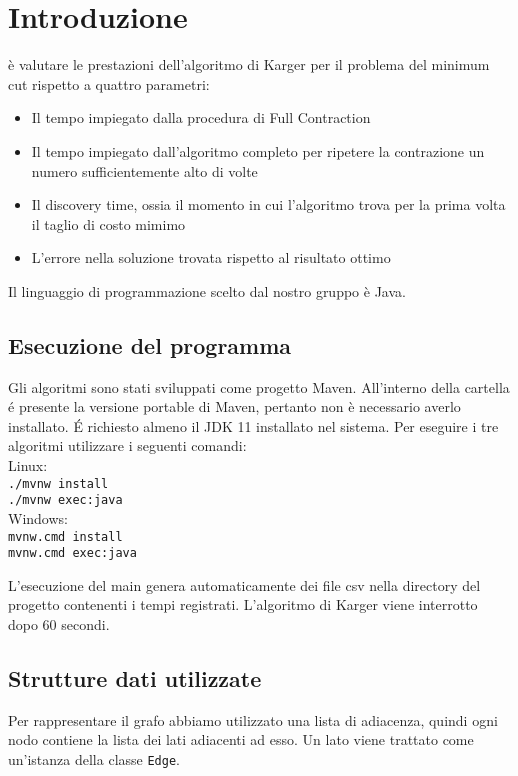 \section{Introduzione}

è valutare le prestazioni dell'algoritmo di Karger per il problema del minimum cut rispetto a quattro parametri:
\begin{itemize}
\item Il tempo impiegato dalla procedura di Full Contraction
\item Il tempo impiegato dall'algoritmo completo per ripetere la contrazione un numero sufficientemente alto di volte
\item Il discovery time, ossia il momento in cui l'algoritmo trova per la prima volta il taglio di costo mimimo
\item L'errore nella soluzione trovata rispetto al risultato ottimo
\end{itemize}
Il linguaggio di programmazione scelto dal nostro gruppo è Java.

\subsection{Esecuzione del programma}
Gli algoritmi sono stati sviluppati come progetto Maven. All'interno della cartella \'e presente la versione portable di Maven, pertanto non è necessario averlo installato. \'E
richiesto almeno il JDK 11 installato nel sistema.
Per eseguire i tre algoritmi utilizzare i seguenti comandi:\\
Linux:\\
\indent \texttt{./mvnw install}\\
\indent \texttt{./mvnw exec:java}\\
Windows:\\
\indent \texttt{mvnw.cmd install}\\
\indent \texttt{mvnw.cmd exec:java}

L'esecuzione del main genera automaticamente dei file csv nella directory del progetto contenenti i tempi registrati. 
L'algoritmo di Karger viene interrotto dopo 60 secondi.
\subsection{Strutture dati utilizzate}

Per rappresentare il grafo abbiamo utilizzato una lista di adiacenza, quindi ogni nodo contiene la lista dei lati adiacenti ad esso.
Un lato viene trattato come un'istanza della classe \texttt{Edge}.

